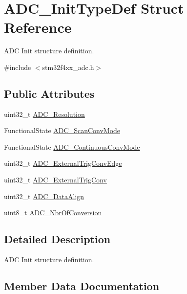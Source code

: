 \hypertarget{struct_a_d_c___init_type_def}{}\section{A\+D\+C\+\_\+\+Init\+Type\+Def Struct Reference}
\label{struct_a_d_c___init_type_def}


A\+D\+C Init structure definition.  




{\ttfamily \#include $<$stm32f4xx\+\_\+adc.\+h$>$}

\subsection*{Public Attributes}
\begin{DoxyCompactItemize}
\item 
uint32\+\_\+t \hyperlink{struct_a_d_c___init_type_def_a275d9553bbe17a60d618b619678b7c94}{A\+D\+C\+\_\+\+Resolution}
\item 
Functional\+State \hyperlink{struct_a_d_c___init_type_def_aaf44f54f22ab40bf8fae01f075aa4c87}{A\+D\+C\+\_\+\+Scan\+Conv\+Mode}
\item 
Functional\+State \hyperlink{struct_a_d_c___init_type_def_a2149036a332281e70a36879a2396b8d1}{A\+D\+C\+\_\+\+Continuous\+Conv\+Mode}
\item 
uint32\+\_\+t \hyperlink{struct_a_d_c___init_type_def_abe372c73942aef47016be85ca1b79650}{A\+D\+C\+\_\+\+External\+Trig\+Conv\+Edge}
\item 
uint32\+\_\+t \hyperlink{struct_a_d_c___init_type_def_ae5d0c48e70c2a39355b7ab0cc1df8310}{A\+D\+C\+\_\+\+External\+Trig\+Conv}
\item 
uint32\+\_\+t \hyperlink{struct_a_d_c___init_type_def_a622e89d8fba3900f20aaf40d5560ab7b}{A\+D\+C\+\_\+\+Data\+Align}
\item 
uint8\+\_\+t \hyperlink{struct_a_d_c___init_type_def_a4a508c4bed196dcd50ba03b49c78f460}{A\+D\+C\+\_\+\+Nbr\+Of\+Conversion}
\end{DoxyCompactItemize}


\subsection{Detailed Description}
A\+D\+C Init structure definition. 

\subsection{Member Data Documentation}
\hypertarget{struct_a_d_c___init_type_def_a2149036a332281e70a36879a2396b8d1}{}
